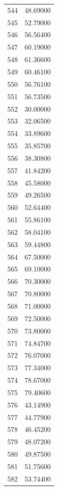 \documentclass[
  letterpaper,
  DIV=11,
  numbers=noendperiod]{scrreprt}
\begin{document}
\begin{tcolorbox}
\begin{tabular}{lr}
544  &         48.69000 \\
545  &         52.79000 \\
546  &         56.56400 \\
547  &         60.19000 \\
548  &         61.36600 \\
549  &         60.46100 \\
550  &         56.76100 \\
551  &         56.73500 \\
552  &         30.00000 \\
553  &         32.06500 \\
554  &         33.89600 \\
555  &         35.85700 \\
556  &         38.30800 \\
557  &         41.84200 \\
558  &         45.58000 \\
559  &         49.26500 \\
560  &         52.64400 \\
561  &         55.86100 \\
562  &         58.04100 \\
563  &         59.44800 \\
564  &         67.50000 \\
565  &         69.10000 \\
566  &         70.30000 \\
567  &         70.80000 \\
568  &         71.00000 \\
569  &         72.50000 \\
570  &         73.80000 \\
571  &         74.84700 \\
572  &         76.07000 \\
573  &         77.34000 \\
574  &         78.67000 \\
575  &         79.40600 \\
576  &         43.14900 \\
577  &         44.77900 \\
578  &         46.45200 \\
579  &         48.07200 \\
580  &         49.87500 \\
581  &         51.75600 \\
582  &         53.74400 \\

\end{tabular}
\end{tcolorbox}
\end{document}

